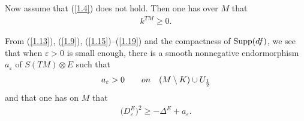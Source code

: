 \documentclass[11pt]{article}
\numberwithin{equation}{section}
\numberwithin{equation}{section}
\theoremstyle{definition}
\begin{document}
Now assume that (\ref{1.4}) does not hold. Then one has over $M$ that
 \begin{gather}\label{1.19}
k^{TM}\geq 0.
\end{gather}

From (\ref{1.13}), (\ref{1.9}), (\ref{1.15})--(\ref{1.19}) and the compactness of $\operatorname{Supp}({\rm d}f)$, we see that when $\varepsilon>0$ is small enough, there is a smooth nonnegative endormorphism $a_\varepsilon$ of $S(TM)\widehat\otimes E$ such that
 \begin{gather}\label{1.20}
a_\varepsilon>0 \qquad {\rm on}\quad (M\setminus K)\cup U_{\frac{1}{2}}
\end{gather}
and that one has on $M$ that
\begin{gather}\label{1.21}
\big(D_\varepsilon^E\big)^2 \geq -\Delta^E +a_\varepsilon.
\end{gather}
\end{document}
